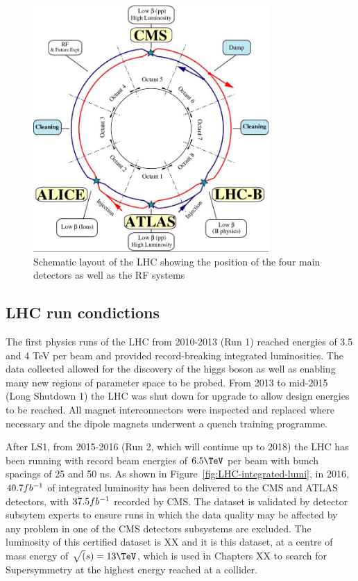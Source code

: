 \begin{figure}
\centering
    \includegraphics[width=0.8\textwidth]{./Figures/detector/lhcDiagram}
  \caption{Schematic layout of the LHC showing the position of the four main detectors as
  well as the RF systems}
  \label{fig:LHC-diagram}
\end{figure}

\subsection{LHC run condictions}

The first physics runs of the LHC from 2010-2013 (Run 1) reached energies of 3.5 and 4 TeV per beam and 
provided record-breaking integrated luminosities. The data collected allowed 
for the discovery of the higgs boson\cite{higgs} as well as enabling many new regions of parameter space
to be probed. From 2013 to mid-2015 (Long Shutdown 1) the LHC was shut down for upgrade to allow design
energies to be reached. All magnet interconnectors were inspected and replaced where necessary 
and the dipole magnets underwent a quench training programme. 

After LS1, from 2015-2016 (Run 2, which will continue up to 2018) the LHC has been running with record beam energies 
of $6.5\TeV$ per beam with bunch spacings of 25 and 50 ns. 
As shown in Figure~\ref{fig:LHC-integrated-lumi}, in 2016, $40.7fb^{-1}$ of integrated luminosity has been 
delivered to the CMS and ATLAS detectors, with $37.5fb^{-1}$ recorded by CMS. The dataset is validated by detector
subsytem experts to ensure runs in which the data quality may be affected by any problem in one of the CMS detectors 
subsystems are excluded. The luminosity of this certified dataset is XX and it is this dataset, 
at a centre of mass energy of $\sqrt(s) = 13\TeV$, 
which is used in Chapters XX to search for Supersymmetry at the highest energy reached at a collider.

